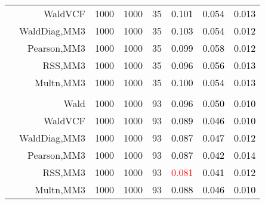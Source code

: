 \documentclass[
]{article}
\begin{document}
\begin{table}[H]
{\begin{tabular}[t]{lrrrrrrr}
\hspace{1em} & WaldVCF & 1000 & 1000 & 35 & \textcolor{black}{0.101} & \textcolor{black}{0.054} & \textcolor{black}{0.013}\\

\hspace{1em} & WaldDiag,MM3 & 1000 & 1000 & 35 & \textcolor{black}{0.103} & \textcolor{black}{0.054} & \textcolor{black}{0.012}\\

\hspace{1em} & Pearson,MM3 & 1000 & 1000 & 35 & \textcolor{black}{0.099} & \textcolor{black}{0.058} & \textcolor{black}{0.012}\\

\hspace{1em} & RSS,MM3 & 1000 & 1000 & 35 & \textcolor{black}{0.096} & \textcolor{black}{0.056} & \textcolor{black}{0.013}\\

\hspace{1em} & Multn,MM3 & 1000 & 1000 & 35 & \textcolor{black}{0.100} & \textcolor{black}{0.054} & \textcolor{black}{0.013}\\
\cmidrule{1-8}
\addlinespace[0.3em]
\multicolumn{8}{l}{\textbf{3F 15V}}\\
\hspace{1em} & Wald & 1000 & 1000 & 93 & \textcolor{black}{0.096} & \textcolor{black}{0.050} & \textcolor{black}{0.010}\\

\hspace{1em} & WaldVCF & 1000 & 1000 & 93 & \textcolor{black}{0.089} & \textcolor{black}{0.046} & \textcolor{black}{0.010}\\

\hspace{1em} & WaldDiag,MM3 & 1000 & 1000 & 93 & \textcolor{black}{0.087} & \textcolor{black}{0.047} & \textcolor{black}{0.012}\\

\hspace{1em} & Pearson,MM3 & 1000 & 1000 & 93 & \textcolor{black}{0.087} & \textcolor{black}{0.042} & \textcolor{black}{0.014}\\

\hspace{1em} & RSS,MM3 & 1000 & 1000 & 93 & \textcolor{red}{0.081} & \textcolor{black}{0.041} & \textcolor{black}{0.012}\\

\hspace{1em} & Multn,MM3 & 1000 & 1000 & 93 & \textcolor{black}{0.088} & \textcolor{black}{0.046} & \textcolor{black}{0.010}\\
\bottomrule
\end{tabular}}
\endgroup{}
\end{table}
\end{document}
